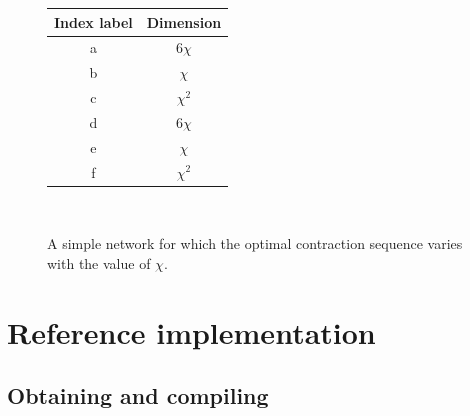 \documentclass[aps,pre,reprint,superscriptaddress,amsfonts,amsmath,showpacs,nofootinbib,floatfix]{revtex4-1}
\newcommand{\arXtext}[1]{#1}
\begin{document}
\begin{figure}
\begin{tabular}{|c|c|}
\hline
Index label & Dimension\\
\hline\hline
a & $6\chi$\\
b & $\chi$\\
c & $\chi^2$\\
d & $6\chi$\\
e & $\chi$\\
f & $\chi^2$\\\hline
\end{tabular}~~~~~~~~~
\caption{A simple network for which the optimal contraction sequence varies with the value of $\chi$.\label{fig:threetensors}}
\end{figure}%
\arXtext{\section{Reference implementation\label{sec:refimp}}}

\arXtext{\subsection{Obtaining and compiling}}
\end{document}
